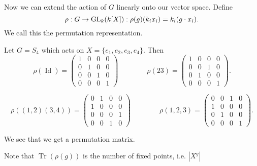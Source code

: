 Now we can extend the action of $G$ linearly onto our vector space.
Define 
\[
    \rho: G \to \operatorname{GL}_{k}(k[X]): \rho(g)(k_i x_i) = k_i (g\cdot x_i)
.\] 
We call this the permutation representation.

\begin{ex}
    Let $G = S_4$ which acts on $X = \{e_1, e_2, e_3, e_4\}$.
    Then
    \[
        \rho(\operatorname{Id}) = \begin{pmatrix}
            1 & 0 & 0 & 0\\
            0 & 1 & 0 & 0\\
            0 & 0 & 1 & 0 \\
            0 & 0 & 0 & 1
        \end{pmatrix}
        \qquad
        \qquad
        \rho(23) = \begin{pmatrix}
            1 & 0 & 0 & 0\\
            0 & 0 & 1 & 0\\
            0 & 1 & 0 & 0 \\
            0 & 0 & 0 & 1
        \end{pmatrix}
    .\] 

    \[
        \rho((1,2)(3,4)) = \begin{pmatrix}
            0 & 1 & 0 & 0\\
            1 & 0 & 0 & 0\\
            0 & 0 & 0 & 1 \\
            0 & 0 & 1 & 0
        \end{pmatrix}
        \qquad
        \qquad
        \rho(1,2,3) = \begin{pmatrix}
            0 & 0 & 1 & 0\\
            1 & 0 & 0 & 0\\
            0 & 1 & 0 & 0 \\
            0 & 0 & 0 & 1
        \end{pmatrix}
    .\] 

    We see that we get a permutation matrix.
\end{ex}

\begin{remark}
    Note that $\operatorname{Tr}(\rho(g))$ is the number of fixed points, i.e. $|X^{g}|$
\end{remark}


